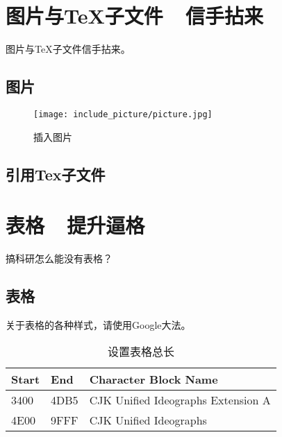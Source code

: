 

\section{图片与TeX子文件\ \ 信手拈来}

图片与TeX子文件信手拈来。

\subsection{图片}

\begin{figure}
    \centering
    \texttt{[image: include\_picture/picture.jpg]}
    \caption{插入图片}
\end{figure}

\subsection{引用Tex子文件}






\clearpage
\section{表格\ \ 提升逼格}

搞科研怎么能没有表格？\\

\subsection{表格}

关于表格的各种样式，请使用Google大法。\\
\begin{table}[H]
\caption{设置表格总长} 
\begin{tabular*}{12cm}{lll}
\hline  
Start & End  & Character Block Name \\  
\hline  
3400  & 4DB5 & CJK Unified Ideographs Extension A \\  
4E00  & 9FFF & CJK Unified Ideographs \\  
\hline  
\end{tabular*} 
\end{table} 


